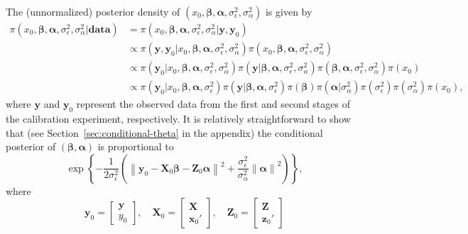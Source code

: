 \documentclass[cmfont,usenames,dvipsnames,leqno]{afit-etd}\usepackage[]{graphicx}\usepackage[]{color}
\newcommand{\norm}[1]{\left\|#1\right\|}
\begin{document}
The (unnormalized) posterior density of $(x_0, \bm{\beta}, \bm{\alpha}, \sigma_\epsilon^2, \sigma_\alpha^2)$ is given by
\begin{align*}
  \pi(x_0, \bm{\beta}, \bm{\alpha}, \sigma_\epsilon^2, \sigma_\alpha^2 | \mathbf{data}) &= \pi(x_0, \bm{\beta}, \bm{\alpha}, \sigma_\epsilon^2, \sigma_\alpha^2 | \bm{y}, \bm{y}_0) \\
  &\propto \pi(\bm{y}, \bm{y}_0 | x_0, \bm{\beta}, \bm{\alpha}, \sigma_\epsilon^2, \sigma_\alpha^2)\pi(x_0, \bm{\beta}, \bm{\alpha}, \sigma_\epsilon^2, \sigma_\alpha^2) \\
  &\propto \pi(\bm{y}_0 | x_0, \bm{\beta}, \bm{\alpha}, \sigma_\epsilon^2, \sigma_\alpha^2)\pi(\bm{y} | \bm{\beta}, \bm{\alpha}, \sigma_\epsilon^2, \sigma_\alpha^2)\pi(\bm{\beta}, \bm{\alpha}, \sigma_\epsilon^2, \sigma_\alpha^2)\pi(x_0) \\
  &\propto \pi(\bm{y}_0 | x_0, \bm{\beta}, \bm{\alpha}, \sigma_\epsilon^2)\pi(\bm{y} | \bm{\beta}, \bm{\alpha}, \sigma_\epsilon^2)\pi(\bm{\beta})\pi(\bm{\alpha}|\sigma_\alpha^2)\pi(\sigma_\epsilon^2)\pi(\sigma_\alpha^2)\pi(x_0),
\end{align*}
where $\bm{y}$ and $\bm{y}_0$ represent the observed data from the first and second stages of the calibration experiment, respectively. It is relatively straightforward to show that (see Section~\ref{sec:conditional-theta} in the appendix) the conditional posterior of $(\bm{\beta}, \bm{\alpha})$ is proportional to
\begin{equation*}
  \exp\left\{ -\frac{1}{2\sigma_\epsilon^2}\left(\norm{\bm{y}_0 - \bm{X}_0\bm{\beta} - \bm{Z}_0\bm{\alpha}}^2 + \frac{\sigma_\epsilon^2}{\sigma_\alpha^2}\norm{\bm{\alpha}}^2\right) \right\},
\end{equation*}
where
\begin{equation*}
  \bm{y}_0 = \begin{bmatrix} \bm{y} \\ y_0 \end{bmatrix}, \quad
  \bm{X}_0 = \begin{bmatrix} \bm{X} \\ \bm{x}_0' \end{bmatrix}, \quad
  \bm{Z}_0 = \begin{bmatrix} \bm{Z} \\ \bm{z}_0' \end{bmatrix}
\end{equation*}
\end{document}
